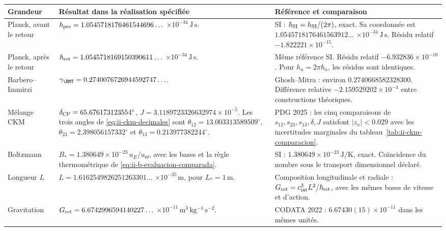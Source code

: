 \begin{table}[!htbp]
\centering\small
\setlength{\tabcolsep}{4pt}
\renewcommand{\arraystretch}{1.12}
\begin{tabularx}{\linewidth}{@{}>{\raggedright\arraybackslash}p{.16\linewidth}>{\raggedright\arraybackslash}X>{\raggedright\arraybackslash}X@{}}
\toprule
Grandeur & Résultat dans la réalisation spécifiée & Référence et comparaison\\
\midrule
Planck, avant le retour
& \(\hbar_{\rm pre}=1.0545718176461544696\ldots\)
  \(\times10^{-34}\,\mathrm{J\,s}\).
& SI : \(\hbar_{\rm SI}=h_{\rm SI}/(2\pi)\), exact.
  Sa coordonnée est \(1.0545718176461563912\ldots\)
  \(\times10^{-34}\,\mathrm{J\,s}\).
  Résidu relatif \(-1.822221\times10^{-15}\).\\[4pt]
Planck, après le retour
& \(\hbar_{\rm ret}=1.0545718169150390611\ldots\)
  \(\times10^{-34}\,\mathrm{J\,s}\).
& Même référence SI.
  Résidu relatif \(-6.932836\times10^{-10}\).
  Pour \(h_a=2\pi\hbar_a\), les résidus sont identiques.\\[4pt]
Barbero--Immirzi
& \(\gamma_{\HMT}=0.2740076726944592747\ldots\).
& Ghosh--Mitra : environ \(0.2740668582328300\).
  Différence relative \(-2.159529202\times10^{-4}\)
  entre constructions théoriques.\\[4pt]
Mélange CKM
& \(\delta_{\rm CP}=65.676173123554^\circ\),
  \(J=3.1189723326632974\times10^{-5}\).
  Les trois angles de \eqref{eq:ii-ckm-decimales} sont
  \(\theta_{12}=13.003313589509^\circ\),
  \(\theta_{23}=2.398056157332^\circ\) et
  \(\theta_{13}=0.213977382244^\circ\).
& PDG 2025 : les cinq comparaisons de
  \(s_{12},s_{23},s_{13},\delta,J\) satisfont \(|z_x|<0.029\)
  avec les incertitudes marginales du
  tableau~\ref{tab:ii-ckm-comparacion}.\\[4pt]
Boltzmann
& \(B_*=1.380649\times10^{-23}\,u_E/u_\Theta\),
  avec les bases et la règle thermométrique de
  \eqref{eq:ii-b-evaluacion-comparada}.
& SI : \(1.380649\times10^{-23}\,\mathrm{J/K}\), exact.
  Coïncidence du nombre sous le transport dimensionnel déclaré.\\[4pt]
Longueur \(L\)
& \(L=1.6162549826251263301\ldots\)
  \(\times10^{-35}\,\mathrm m\), pour \(L_*=1\,\mathrm m\).
& Composition longitudinale et radiale :
  \(G_{\rm ret}=c_{\rm int}^3L^2/\hbar_{\rm ret}\),
  avec les mêmes bases de vitesse et d’action.\\[4pt]
Gravitation
& \(G_{\rm ret}=6.6742996594140227\ldots\)
  \(\times10^{-11}\,\mathrm{m^3\,kg^{-1}\,s^{-2}}\).
& CODATA 2022 : \(6.67430(15)\times10^{-11}\) dans les mêmes unités.

\end{tabularx}
\end{table}
